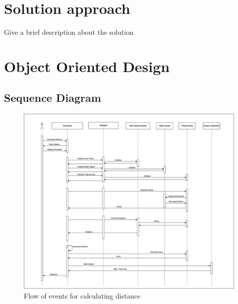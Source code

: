 \section{Solution approach}
    Give a brief description about the solution
    \pagebreak

  \section{Object Oriented Design}
    \subsection{Sequence Diagram}
      \vspace{1cm}
      \begin{figure}[h!]
        \includegraphics[width=1\linewidth]{resources/cheers-sequence.png}
        \vspace{.5cm}
        \caption{Flow of events for calculating distance}
        \label{fig:Sequence Diagram}
      \end{figure}
      \pagebreak

